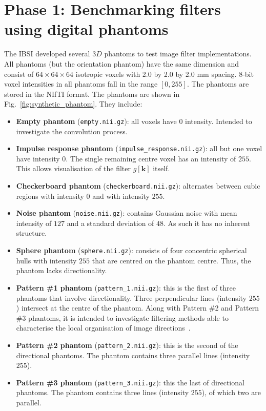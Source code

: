 \documentclass[fleqn,a4paper,oneside,openany]{book}
\begin{document}
\section{Phase 1: Benchmarking filters using digital phantoms}\label{sec:benchmarkingMethodo}
%
The IBSI developed several 3$D$ phantoms to test image filter implementations. All phantoms (but the orientation phantom) have the same dimension and consist of $64\times 64\times 64$ isotropic voxels with 2.0 by 2.0 by 2.0 mm spacing. 8-bit voxel intensities in all phantoms fall in the range $[0,255]$. The phantoms are stored in the NIfTI format.
The phantoms are shown in Fig.~\ref{fig:synthetic_phantom}.
They include:
\begin{itemize}
    \item \textbf{Empty phantom} (\texttt{empty.nii.gz}): all voxels have $0$ intensity. Intended to investigate the convolution process.
    \item \textbf{Impulse response phantom} (\texttt{impulse\_response.nii.gz}): all but one voxel have intensity $0$. The single remaining centre voxel has an intensity of $255$. This allows visualisation of the filter $g[\boldsymbol{k}]$ itself.
    \item \textbf{Checkerboard phantom} (\texttt{checkerboard.nii.gz}): alternates between cubic regions with intensity $0$ and with intensity $255$.
    \item \textbf{Noise phantom} (\texttt{noise.nii.gz}): contains Gaussian noise with mean intensity of $127$ and a standard deviation of $48$. As such it has no inherent structure.
    \item \textbf{Sphere phantom} (\texttt{sphere.nii.gz}): consists of four concentric spherical hulls with intensity $255$ that are centred on the phantom centre. Thus, the phantom lacks directionality. 
    \item \textbf{Pattern \#1 phantom} (\texttt{pattern\_1.nii.gz}): this is the first of three phantoms that involve directionality. Three perpendicular lines (intensity $255$) intersect at the centre of the phantom. Along with Pattern \#2 and Pattern \#3 phantoms, it is intended to investigate filtering methods able to characterise the local organisation of image directions~\cite{DCS2017}.
    \item \textbf{Pattern \#2 phantom} (\texttt{pattern\_2.nii.gz}): this is the second of the directional phantoms. The phantom contains three parallel lines (intensity $255$).
    \item \textbf{Pattern \#3 phantom} (\texttt{pattern\_3.nii.gz}): this the last of directional phantoms. The phantom contains three lines (intensity $255$), of which two are parallel.

\end{itemize}
\end{document}

